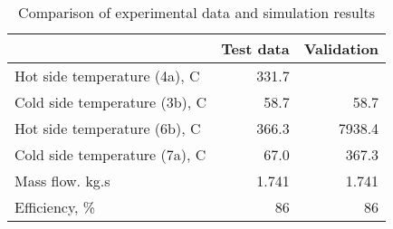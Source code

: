 \begin{table}
\label{tab:Comparison}
\caption{Comparison of experimental data and simulation results}
\begin{center}
\begin{tabulary}{0.9\textwidth}{LRR}
\toprule
& Test data \cite{Iverson_2013}  & Validation \\
\midrule
Hot side temperature (4a), C & 331.7 &  \\
Cold side temperature (3b), C & 58.7 & 58.7 \\
Hot side temperature (6b), C & 366.3 & 7938.4 \\
Cold side temperature (7a), C & 67.0 & 367.3 \\
Mass flow. kg.s & 1.741 & 1.741 \\
Efficiency, \% & 86 & 86 \\
\bottomrule
\end{tabulary}
\end{center}
\end{table}